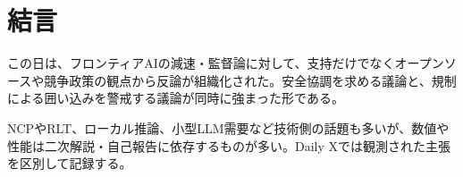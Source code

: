 \section{結言}
この日は、フロンティアAIの減速・監督論に対して、支持だけでなくオープンソースや競争政策の観点から反論が組織化された。安全協調を求める議論と、規制による囲い込みを警戒する議論が同時に強まった形である。

NCPやRLT、ローカル推論、小型LLM需要など技術側の話題も多いが、数値や性能は二次解説・自己報告に依存するものが多い。Daily Xでは観測された主張を区別して記録する。
